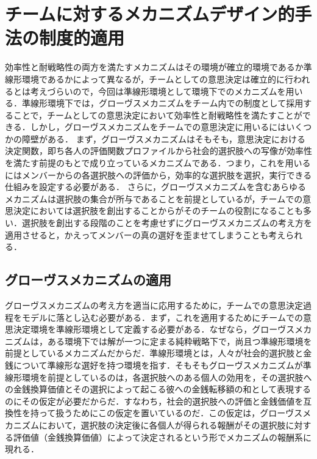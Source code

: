 \documentclass[a4paper, 11pt]{jsarticle}
\begin{document}
\section{チームに対するメカニズムデザイン的手法の制度的適用}
効率性と耐戦略性の両方を満たすメカニズムはその環境が確立的環境であるか準線形環境であるかによって異なるが，チームとしての意思決定は確立的に行われるとは考えづらいので，今回は準線形環境として環境下でのメカニズムを用いる．準線形環境下では，グローヴスメカニズムをチーム内での制度として採用することで，チームとしての意思決定において効率性と耐戦略性を満たすことができる．しかし，グローヴスメカニズムをチームでの意思決定に用いるにはいくつかの障壁がある．
まず，グローヴスメカニズムはそもそも，意思決定における決定関数，即ち各人の評価関数プロファイルから社会的選択肢への写像が効率性を満たす前提のもとで成り立っているメカニズムである．つまり，これを用いるにはメンバーからの各選択肢への評価から，効率的な選択肢を選択，実行できる仕組みを設定する必要がある．
さらに，グローヴスメカニズムを含むあらゆるメカニズムは選択肢の集合が所与であることを前提としているが，チームでの意思決定においては選択肢を創出することからがそのチームの役割になることも多い．選択肢を創出する段階のことを考慮せずにグローヴスメカニズムの考え方を適用させると，かえってメンバーの真の選好を歪ませてしまうことも考えられる．

\subsection{グローヴスメカニズムの適用}
グローヴスメカニズムの考え方を適当に応用するために，チームでの意思決定過程をモデルに落とし込む必要がある．まず，これを適用するためにチームでの意思決定環境を準線形環境として定義する必要がある．なぜなら，グローヴスメカニズムは，ある環境下では解が一つに定まる純粋戦略下で，尚且つ準線形環境を前提としているメカニズムだからだ．準線形環境とは，人々が社会的選択肢と金銭について準線形な選好を持つ環境を指す．そもそもグローヴスメカニズムが準線形環境を前提としているのは，各選択肢へのある個人の効用を，その選択肢への金銭換算価値とその選択によって起こる彼への金銭転移額の和として表現するのにその仮定が必要だからだ．すなわち，社会的選択肢への評価と金銭価値を互換性を持って扱うためにこの仮定を置いているのだ．この仮定は，グローヴスメカニズムにおいて，選択肢の決定後に各個人が得られる報酬がその選択肢に対する評価値（金銭換算価値）によって決定されるという形でメカニズムの報酬系に現れる．
\end{document}
